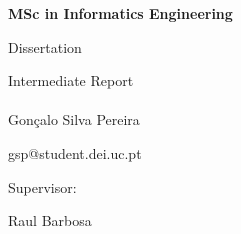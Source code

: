 \begin{titlepage}



\small{\bf MSc in Informatics Engineering}

\small{Dissertation}

\small{Intermediate Report}
\\[1.1in]

\Huge
\textbf{}\\[0.8in]

\Large{Gonçalo Silva Pereira}

\small{gsp@student.dei.uc.pt}

\vspace{0.5cm}

\small{Supervisor:}

\Large{Raul Barbosa}\\[0.3in]






\end{titlepage}
